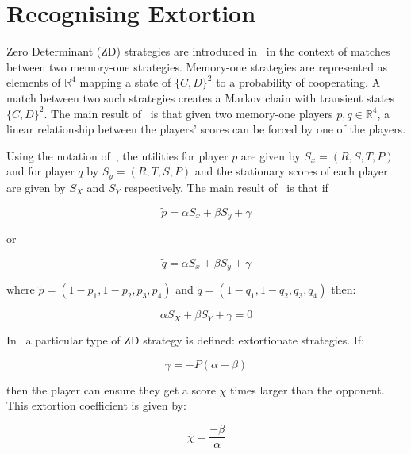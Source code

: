 \documentclass[a4paper]{article}
\begin{document}
\section{Recognising Extortion}\label{sec:kappa-zd-strategies}

Zero Determinant (ZD) strategies are introduced in~\cite{Press2012} in the
context of matches between two memory-one strategies. Memory-one strategies are
represented as elements of \(\mathbb{R}^4\) mapping a state of \({\{C, D\}}^2\)
to a probability of cooperating. A match between two such strategies creates a
Markov chain with transient states \({\{C, D\}}^2\). The main result
of~\cite{Press2012} is that given two memory-one players \(p,
q\in\mathbb{R}^4\), a linear relationship between the players' scores can be
forced by one of the players.

Using the notation of~\cite{Press2012}, the utilities for player \(p\)
are given by \(S_x=(R, S, T, P)\) and for player \(q\) by \(S_y=(R, T, S, P)\)
and the stationary scores of each player are given by \(S_X\) and \(S_Y\)
respectively. The main result of~\cite{Press2012} is that if

\begin{equation}\label{eqn:linear_relationship_for_p}
    \tilde p=\alpha S_x + \beta S_y + \gamma
\end{equation}

or

\begin{equation}\label{eqn:linear_relationship_for_q}
    \tilde q=\alpha S_x + \beta S_y + \gamma
\end{equation}

where \(\tilde p = (1 - p_1, 1 - p_2, p_3, p_4)\) and
\(\tilde q = (1 - q_1, 1 - q_2, q_3, q_4)\) then:

\begin{equation}
    \alpha S_X + \beta S_Y + \gamma = 0
\end{equation}

In~\cite{Press2012} a particular type of ZD strategy is defined: extortionate
strategies. If:

\begin{equation}\label{eqn:constraint_for_extortion}
    \gamma = - P(\alpha + \beta)
\end{equation}

then the player can ensure they get a score \(\chi\) times
larger than the opponent. This extortion coefficient is given by:

\begin{equation}\label{eqn:definition_of_chi}
    \chi=\frac{-\beta}{\alpha}
\end{equation}
\end{document}
